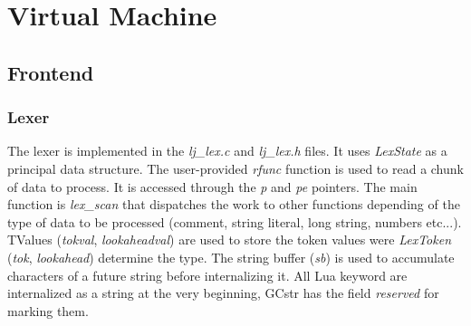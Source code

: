 \chapter{Virtual Machine}
\label{Chapt:VM}
  

\section{Frontend}
\label{Sec:frontend}



\subsection{Lexer}
\label{Subsec:Lexer}

The lexer is implemented in the \emph{lj\_lex.c} and \emph{lj\_lex.h} files.
It uses \emph{LexState} as a principal data structure. The user-provided
\emph{rfunc} function is used to read a chunk of data to process. It is accessed
through the \emph{p} and \emph{pe} pointers. The main function is
\emph{lex\_scan} that dispatches the work to other functions depending of the
type of data to be processed (comment, string literal, long string, numbers
etc...). TValues (\emph{tokval}, \emph{lookaheadval}) are used to store the
token values were \emph{LexToken} (\emph{tok}, \emph{lookahead}) determine the
type. The string buffer (\emph{sb}) is used to accumulate characters of a future
string before internalizing it. All Lua keyword are internalized as a string at
the very beginning, GCstr has the field \emph{reserved} for marking them.

